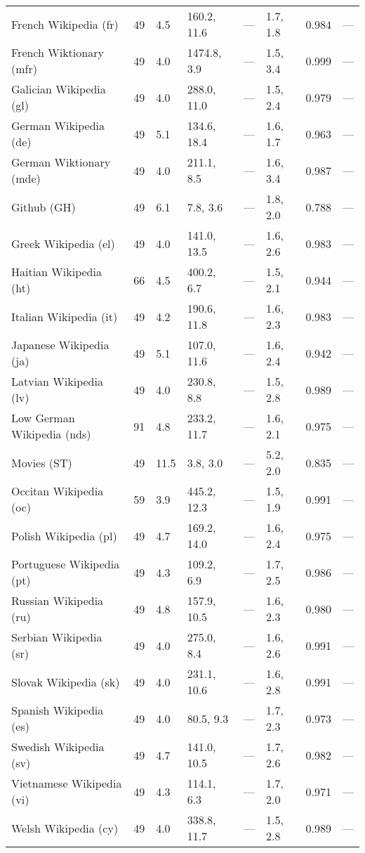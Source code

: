 \begin{longtable}{ llllllll }
French Wikipedia (\textsf{fr})    & 49 & 4.5 & 160.2, 11.6 & --- & 1.7, 1.8 & 0.984 & --- \\
French Wiktionary (\textsf{mfr})  & 49 & 4.0 & 1474.8, 3.9 & --- & 1.5, 3.4 & 0.999 & --- \\
Galician Wikipedia (\textsf{gl})  & 49 & 4.0 & 288.0, 11.0 & --- & 1.5, 2.4 & 0.979 & --- \\
German Wikipedia (\textsf{de})    & 49 & 5.1 & 134.6, 18.4 & --- & 1.6, 1.7 & 0.963 & --- \\
German Wiktionary (\textsf{mde})  & 49 & 4.0 & 211.1, 8.5 & --- & 1.6, 3.4 & 0.987 & --- \\
Github (\textsf{GH})              & 49 & 6.1 & 7.8, 3.6 & --- & 1.8, 2.0 & 0.788 & --- \\
Greek Wikipedia (\textsf{el})     & 49 & 4.0 & 141.0, 13.5 & --- & 1.6, 2.6 & 0.983 & --- \\
Haitian Wikipedia (\textsf{ht})   & 66 & 4.5 & 400.2, 6.7 & --- & 1.5, 2.1 & 0.944 & --- \\
Italian Wikipedia (\textsf{it})   & 49 & 4.2 & 190.6, 11.8 & --- & 1.6, 2.3 & 0.983 & --- \\
Japanese Wikipedia (\textsf{ja})  & 49 & 5.1 & 107.0, 11.6 & --- & 1.6, 2.4 & 0.942 & --- \\
Latvian Wikipedia (\textsf{lv})   & 49 & 4.0 & 230.8, 8.8 & --- & 1.5, 2.8 & 0.989 & --- \\
Low German Wikipedia (\textsf{nds}) & 91 & 4.8 & 233.2, 11.7 & --- & 1.6, 2.1 & 0.975 & --- \\
Movies (\textsf{ST})              & 49 & 11.5 & 3.8, 3.0 & --- & 5.2, 2.0 & 0.835 & --- \\
Occitan Wikipedia (\textsf{oc})   & 59 & 3.9 & 445.2, 12.3 & --- & 1.5, 1.9 & 0.991 & --- \\
Polish Wikipedia (\textsf{pl})    & 49 & 4.7 & 169.2, 14.0 & --- & 1.6, 2.4 & 0.975 & --- \\
Portuguese Wikipedia (\textsf{pt}) & 49 & 4.3 & 109.2, 6.9 & --- & 1.7, 2.5 & 0.986 & --- \\
Russian Wikipedia (\textsf{ru})   & 49 & 4.8 & 157.9, 10.5 & --- & 1.6, 2.3 & 0.980 & --- \\
Serbian Wikipedia (\textsf{sr})   & 49 & 4.0 & 275.0, 8.4 & --- & 1.6, 2.6 & 0.991 & --- \\
Slovak Wikipedia (\textsf{sk})    & 49 & 4.0 & 231.1, 10.6 & --- & 1.6, 2.8 & 0.991 & --- \\
Spanish Wikipedia (\textsf{es})   & 49 & 4.0 & 80.5, 9.3 & --- & 1.7, 2.3 & 0.973 & --- \\
Swedish Wikipedia (\textsf{sv})   & 49 & 4.7 & 141.0, 10.5 & --- & 1.7, 2.6 & 0.982 & --- \\
Vietnamese Wikipedia (\textsf{vi}) & 49 & 4.3 & 114.1, 6.3 & --- & 1.7, 2.0 & 0.971 & --- \\
Welsh Wikipedia (\textsf{cy})     & 49 & 4.0 & 338.8, 11.7 & --- & 1.5, 2.8 & 0.989 & --- \\


\end{longtable}
